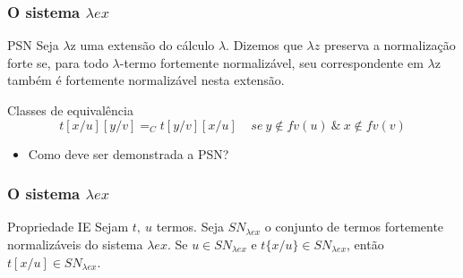 \documentclass{beamer}
\begin{document}
\begin{frame}
\frametitle{O sistema $\lambda ex$}


\begin{block}{PSN}
    Seja $\lambda$z uma extensão do cálculo $\lambda$. Dizemos que $\lambda z$
    preserva a normalização forte se, para todo $\lambda$-termo fortemente
    normalizável, seu correspondente em $\lambda$z também é fortemente
    normalizável nesta extensão.
\end{block}


\pause

\begin{block}{Classes de equivalência}
\[ t[x/u][y/v] =_C t[y/v][x/u] \ \ \ \ \ se\ y \notin fv(u)\ \&\ x \notin fv(v)\] 
\end{block}

\begin{itemize}
    \item Como deve ser demonstrada a PSN?
\end{itemize}

    
\end{frame}



\begin{frame}
\frametitle{O sistema $\lambda ex$}
    
    \begin{block}{ Propriedade IE }
        Sejam $t,\ u$ termos. Seja $SN_{\lambda ex}$ o conjunto de termos fortemente
        normalizáveis do sistema $\lambda ex$. Se $u \in SN_{\lambda ex}$ e
        $t\{x/u\} \in SN_{\lambda ex}$, então $t[x/u] \in SN_{\lambda ex}$.
    \end{block}

\end{frame}
\end{document}
